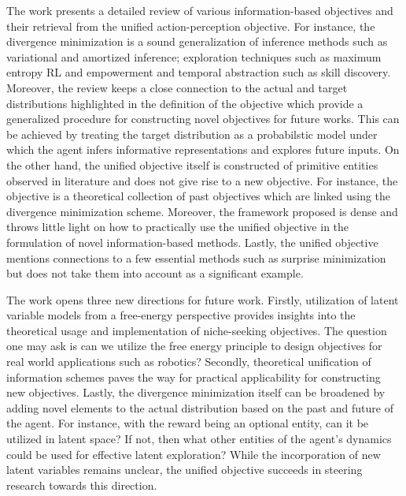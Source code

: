 \documentclass[10.5pt,letterpaper]{article}
\begin{document}
The work presents a detailed review of various information-based objectives and their retrieval from the unified action-perception objective. For instance, the divergence minimization is a sound generalization of inference methods such as variational and amortized inference; exploration techniques such as maximum entropy RL and empowerment and temporal abstraction such as skill discovery. Moreover, the review keeps a close connection to the actual and target distributions highlighted in the definition of the objective which provide a generalized procedure for constructing novel objectives for future works. This can be achieved by treating the target distribution as a probabilstic model under which the agent infers informative representations and explores future inputs. On the other hand, the unified objective itself is constructed of primitive entities observed in literature and does not give rise to a new objective. For instance, the objective is a theoretical collection of past objectives which are linked using the divergence minimization scheme. Moreover, the framework proposed is dense and throws little light on how to practically use the unified objective in the formulation of novel information-based methods. Lastly, the unified objective mentions connections to a few essential methods such as surprise minimization but does not take them into account as a significant example.

The work opens three new directions for future work. Firstly, utilization of latent variable models from a free-energy perspective provides insights into the theoretical usage and implementation of niche-seeking objectives. The question one may ask is can we utilize the free energy principle to design objectives for real world applications such as robotics? Secondly, theoretical unification of information schemes paves the way for practical applicability for constructing new objectives. Lastly, the divergence minimization itself can be broadened by adding novel elements to the actual distribution based on the past and future of the agent. For instance, with the reward being an optional entity, can it be utilized in latent space? If not, then what other entities of the agent's dynamics could be used for effective latent exploration? While the incorporation of new latent variables remains unclear, the unified objective succeeds in steering research towards this direction.
\end{document}
